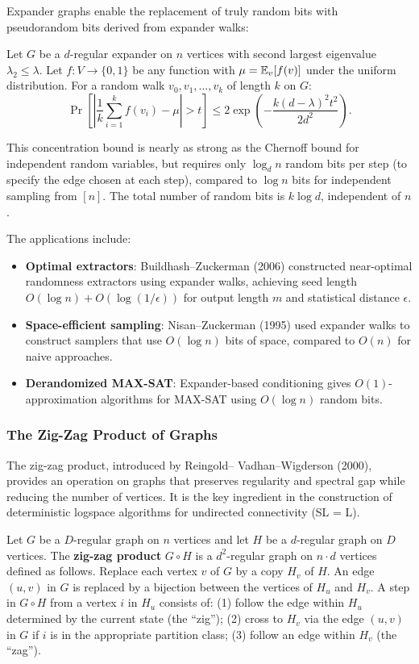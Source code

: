Expander graphs enable the replacement of truly random bits with pseudorandom bits derived from expander walks:

\begin{theorem}
Let $G$ be a $d$-regular expander on $n$ vertices with second largest eigenvalue $\lambda_2 \leq \lambda$. Let $f : V \to \{0, 1\}$ be any function with $\mu = \operatorname{\mathbb{E}}_{v}[f(v)]$ under the uniform distribution. For a random walk $v_0, v_1, \ldots, v_k$ of length $k$ on $G$:
\[
\Pr\left[\left|\frac{1}{k}\sum_{i=1}^{k} f(v_i) - \mu\right| > t\right] \leq 2\exp\left(-\frac{k(d - \lambda)^2 t^2}{2d^2}\right).
\]
\end{theorem}

This concentration bound is nearly as strong as the Chernoff bound for independent random variables, but requires only $\log_d n$ random bits per step (to specify the edge chosen at each step), compared to $\log n$ bits for independent sampling from $[n]$. The total number of random bits is $k \log d$, independent of $n$.

The applications include:
\begin{itemize}
    \item \textbf{Optimal extractors}: Buildhash--Zuckerman (2006) constructed near-optimal randomness extractors using expander walks, achieving seed length $O(\log n) + O(\log(1/\epsilon))$ for output length $m$ and statistical distance $\epsilon$.
    \item \textbf{Space-efficient sampling}: Nisan--Zuckerman (1995) used expander walks to construct samplers that use $O(\log n)$ bits of space, compared to $O(n)$ for naive approaches.
    \item \textbf{Derandomized MAX-SAT}: Expander-based conditioning gives $O(1)$-approximation algorithms for MAX-SAT using $O(\log n)$ random bits.
\end{itemize}

\subsubsection*{The Zig-Zag Product of Graphs}

The zig-zag product, introduced by Reingold-- Vadhan--Wigderson (2000), provides an operation on graphs that preserves regularity and spectral gap while reducing the number of vertices. It is the key ingredient in the construction of deterministic logspace algorithms for undirected connectivity (SL = L).

\begin{definition}
Let $G$ be a $D$-regular graph on $n$ vertices and let $H$ be a $d$-regular graph on $D$ vertices. The \textbf{zig-zag product} $G \circ H$ is a $d^2$-regular graph on $n \cdot d$ vertices defined as follows. Replace each vertex $v$ of $G$ by a copy $H_v$ of $H$. An edge $(u, v)$ in $G$ is replaced by a bijection between the vertices of $H_u$ and $H_v$. A step in $G \circ H$ from a vertex $i$ in $H_u$ consists of: (1) follow the edge within $H_u$ determined by the current state (the ``zig''); (2) cross to $H_v$ via the edge $(u,v)$ in $G$ if $i$ is in the appropriate partition class; (3) follow an edge within $H_v$ (the ``zag'').
\end{definition}

